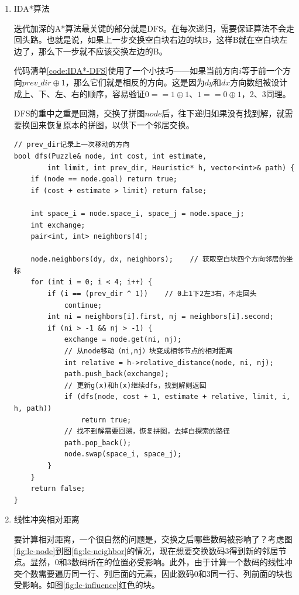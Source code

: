 \documentclass[10pt,letterpaper]{ctexart}
\newcommand{\figref}[1]{图\ref{#1}}
\begin{document}
\begin{enumerate}[itemindent=2.5em,label=\arabic*、]
\newpage
\item IDA*算法
\par \qquad 迭代加深的A*算法最关键的部分就是DFS。在每次递归，需要保证算法不会走回头路。也就是说，如果上一步交换空白块右边的块B，这样B就在空白块左边了，那么下一步就不应该交换左边的B。
\par \qquad 代码清单\ref{code:IDA*-DFS}使用了一个小技巧——如果当前方向$i$等于前一个方向$prev\_dir \oplus 1$，那么它们就是相反的方向。这是因为$dy$和$dx$方向数组被设计成上、下、左、右的顺序，容易验证$0 == 1 \oplus 1$、$1 == 0 \oplus 1$，2、3同理。
\par \qquad DFS的重中之重是回溯，交换了拼图$node$后，往下递归如果没有找到解，就需要换回来恢复原本的拼图，以供下一个邻居交换。
\begin{lstlisting}[caption=IDA*-DFS,label={code:IDA*-DFS},captionpos=b]
// prev_dir记录上一次移动的方向
bool dfs(Puzzle& node, int cost, int estimate,
        int limit, int prev_dir, Heuristic* h, vector<int>& path) {
    if (node == node.goal) return true;
    if (cost + estimate > limit) return false;

    int space_i = node.space_i, space_j = node.space_j;
    int exchange;
    pair<int, int> neighbors[4];

    node.neighbors(dy, dx, neighbors);    // 获取空白块四个方向邻居的坐标
    for (int i = 0; i < 4; i++) {
        if (i == (prev_dir ^ 1))    // 0上1下2左3右，不走回头
            continue;
        int ni = neighbors[i].first, nj = neighbors[i].second;
        if (ni > -1 && nj > -1) {
            exchange = node.get(ni, nj);
            // 从node移动（ni,nj）块变成相邻节点的相对距离
            int relative = h->relative_distance(node, ni, nj);
            path.push_back(exchange);
            // 更新g(x)和h(x)继续dfs，找到解则返回
            if (dfs(node, cost + 1, estimate + relative, limit, i, h, path))
                return true;
            // 找不到解需要回溯，恢复拼图，去掉白探索的路径
            path.pop_back();
            node.swap(space_i, space_j);
        }
    }
    return false;
}
\end{lstlisting}

\newpage
\item 线性冲突相对距离
\par \qquad 要计算相对距离，一个很自然的问题是，交换之后哪些数码被影响了？考虑\figref{fig:lc-node}到\figref{fig:lc-neighbor}的情况，现在想要交换数码3得到新的邻居节点。显然，0和3数码所在的位置必受影响。此外，由于计算一个数码的线性冲突个数需要遍历同一行、列后面的元素，因此数码0和3{\color{red}同一行、列前面的块}也受影响。如\figref{fig:lc-influence}红色的块。


\end{enumerate}
\end{document}
